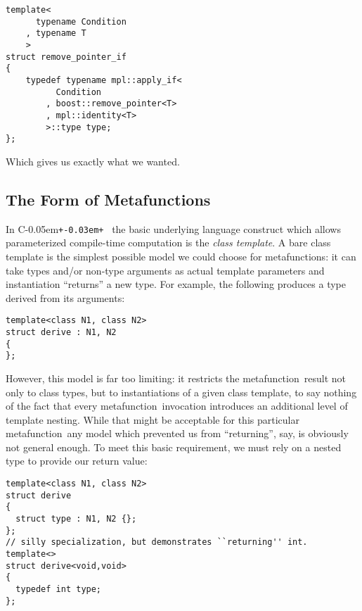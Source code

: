 \documentclass{kapproc}
\newcommand{\Cpp}{C\kern-0.05em\texttt{+\kern-0.03em+}%
}
\newcommand{\mfn}{meta\-func\-tion}
\newcommand{\mfns}{meta\-func\-tions}
\begin{document}
{\small
\begin{codesamp}\begin{verbatim}
template<
      typename Condition
    , typename T
    >
struct remove_pointer_if
{
    typedef typename mpl::apply_if<
          Condition
        , boost::remove_pointer<T>
        , mpl::identity<T>
        >::type type;
};
\end{verbatim}
\end{codesamp}
}

Which gives us exactly what we wanted.



\subsection{The Form of Metafunctions}

In \Cpp\, the basic underlying language construct which allows
parameterized compile-time computation is the \emph{class template}. A
bare class template is the simplest possible model we could choose for
\mfns: it can take types and/or non-type arguments as actual template
parameters and instantiation ``returns'' a new type. For example, the
following produces a type derived from its arguments:

{\small
\begin{codesamp}\begin{verbatim}
template<class N1, class N2>
struct derive : N1, N2
{
};
\end{verbatim}
\end{codesamp}
}

However, this model is far too limiting: it restricts the \mfn\ result
not only to class types, but to instantiations of a given class
template, to say nothing of the fact that every \mfn\ invocation
introduces an additional level of template nesting. While that might
be acceptable for this particular \mfn\, any model which prevented us
from ``returning'', say,  is obviously not general
enough. To meet this basic requirement, we must rely on a nested type
to provide our return value:

{\small
\begin{codesamp}\begin{verbatim}
template<class N1, class N2>
struct derive
{
  struct type : N1, N2 {};
};
// silly specialization, but demonstrates ``returning'' int.
template<>
struct derive<void,void>
{
  typedef int type;
};
\end{verbatim}
\end{codesamp}
}
\end{document}
